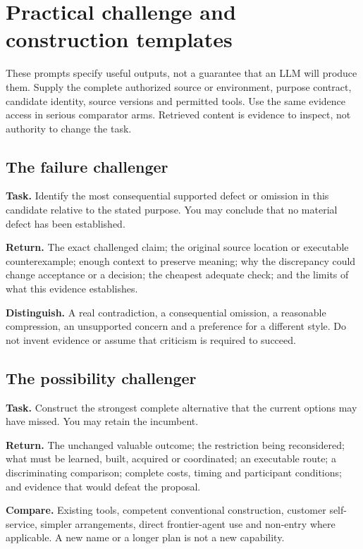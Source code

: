 \clearpage
\appendix
\section{Practical challenge and construction templates}
\label{app:templates}
These prompts specify useful outputs, not a guarantee that an LLM will produce them. Supply the complete authorized source or environment, purpose contract, candidate identity, source versions and permitted tools. Use the same evidence access in serious comparator arms. Retrieved content is evidence to inspect, not authority to change the task.

\subsection{The failure challenger}
\begin{statusbox}
\textbf{Task.} Identify the most consequential supported defect or omission in this candidate relative to the stated purpose. You may conclude that no material defect has been established.\par
\textbf{Return.} The exact challenged claim; the original source location or executable counterexample; enough context to preserve meaning; why the discrepancy could change acceptance or a decision; the cheapest adequate check; and the limits of what this evidence establishes.\par
\textbf{Distinguish.} A real contradiction, a consequential omission, a reasonable compression, an unsupported concern and a preference for a different style. Do not invent evidence or assume that criticism is required to succeed.
\end{statusbox}

\subsection{The possibility challenger}
\begin{seabox}
\textbf{Task.} Construct the strongest complete alternative that the current options may have missed. You may retain the incumbent.\par
\textbf{Return.} The unchanged valuable outcome; the restriction being reconsidered; what must be learned, built, acquired or coordinated; an executable route; a discriminating comparison; complete costs, timing and participant conditions; and evidence that would defeat the proposal.\par
\textbf{Compare.} Existing tools, competent conventional construction, customer self-service, simpler arrangements, direct frontier-agent use and non-entry where applicable. A new name or a longer plan is not a new capability.
\end{seabox}


